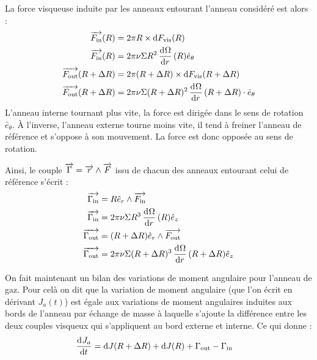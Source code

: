 La force visqueuse induite par les anneaux entourant l'anneau considéré est alors : 
\begin{subequations}
\begin{align}
\vect{F_\text{in}}(R) &= 2\pi R \times \dif F_\text{vis}(R) \nonumber\\
\vect{F_\text{in}}(R)&= 2\pi\nu \Sigma R^2 \dod{\Omega}{r}(R) \hat{e}_\theta\\
\vect{F_\text{out}}(R+\Delta R) &= 2\pi (R+\Delta R) \times \dif F_\text{vis}(R+\Delta R) \nonumber\\
\vect{F_\text{out}}(R+\Delta R)&= 2\pi\nu \Sigma (R+\Delta R)^2 \dod{\Omega}{r}(R+\Delta R) \cdot \hat{e}_\theta
\end{align}
\end{subequations}
L'anneau interne tournant plus vite, la force est dirigée dans le sens de rotation $\hat{e}_\theta$. À l'inverse, l'anneau externe tourne moins vite, il tend à freiner l'anneau de référence et s'oppose à son mouvement. La force est donc opposée au sens de rotation.

\bigskip

Ainsi, le couple ${\overrightarrow{\Gamma}}={\overrightarrow{r}}\wedge{\overrightarrow{F}}$ issu de chacun des anneaux entourant celui de référence s'écrit :
\begin{subequations}
\begin{align}
\vect{\Gamma_\text{in}} &= R\hat{e}_r\wedge\vect{F_\text{in}}\nonumber\\
\vect{\Gamma_\text{in}} &= 2\pi\nu \Sigma R^3 \dod{\Omega}{r}(R) \hat{e}_z\label{eq:G_in}\\
\vect{\Gamma_\text{out}} &= (R+\Delta R)\hat{e}_r\wedge\vect{F_\text{out}}\nonumber\\
\vect{\Gamma_\text{out}} &= 2\pi\nu \Sigma (R+\Delta R)^3 \dod{\Omega}{r}(R+\Delta R) \hat{e}_z\label{eq:G_out}
\end{align}\label{eq:J_torques}
\end{subequations}

\bigskip

On fait maintenant un bilan des variations de moment angulaire pour l'anneau de gaz. Pour celà on dit que la variation de moment angulaire (que l'on écrit en dérivant $J_a(t)$) est égale aux variations de moment angulaires induites aux bords de l'anneau par échange de masse à laquelle s'ajoute la différence entre les deux couples visqueux qui s'appliquent au bord externe et interne. Ce qui donne : 
\begin{align}
\mathinner{ \dfrac{\operatorname{d \!}{^{}}J_a}{\operatorname{d \!}{{t}^{}}} } &= \operatorname{d \!} J(R+\Delta R) + \operatorname{d \!} J(R) + \Gamma_\text{out} - \Gamma_\text{in}\label{eq:cons_J_a}
\end{align}

